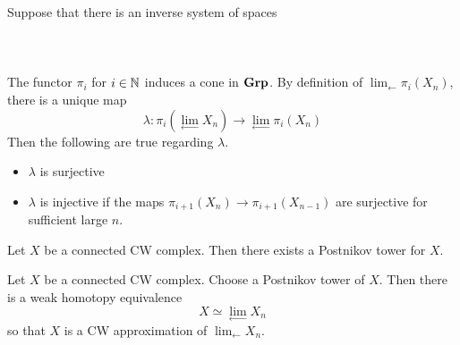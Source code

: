 \documentclass[a4paper]{article}
\begin{document}
\begin{thm}{}{} Suppose that there is an inverse system of spaces \\~\\
\\~\\
The functor $\pi_i$ for $i\in\mathbb{N}$ induces a cone in $\bold{Grp}$. By definition of $\lim_{\leftarrow}\pi_i(X_n)$, there is a unique map $$\lambda:\pi_i\left(\lim_{\leftarrow}X_n\right)\to\lim_{\leftarrow}\pi_i(X_n)$$ Then the following are true regarding $\lambda$. 
\begin{itemize}
\item $\lambda$ is surjective
\item $\lambda$ is injective if the maps $\pi_{i+1}(X_n)\to\pi_{i+1}(X_{n-1})$ are surjective for sufficient large $n$. 
\end{itemize}
\end{thm}

\begin{prp}{}{} Let $X$ be a connected CW complex. Then there exists a Postnikov tower for $X$. 
\end{prp}

\begin{prp}{}{} Let $X$ be a connected CW complex. Choose a Postnikov tower of $X$. Then there is a weak homotopy equivalence $$X\simeq\lim_{\leftarrow}X_n$$ so that $X$ is a CW approximation of $\lim_{\leftarrow}X_n$. 
\end{prp}
\end{document}
